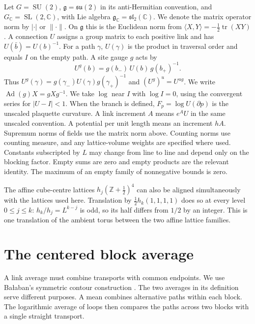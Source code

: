 \documentclass[11pt,letterpaper,reqno]{amsart}
\numberwithin{equation}{section}
\theoremstyle{definition}
\theoremstyle{remark}
\begin{document}
Let \(G=\operatorname{SU}(2)\),
\(\mathfrak g=\mathfrak{su}(2)\) in its anti-Hermitian convention,
and \(G_{\mathbb C}=\operatorname{SL}(2,\mathbb C)\), with Lie
algebra \(\mathfrak g_{\mathbb C}=\mathfrak{sl}_2(\mathbb C)\).
We denote the matrix operator norm by \(|\cdot|\) or \(\|\cdot\|\).
On \(\mathfrak g\) this is the Euclidean norm from
\(\langle X,Y\rangle=-\tfrac12\operatorname{tr}(XY)\).
A connection \(U\) assigns a group matrix to each positive link
and has \(U(\bar b)=U(b)^{-1}\). For a path \(\gamma\),
\(U(\gamma)\) is the product in traversal order and equals \(I\)
on the empty path. A site gauge \(g\) acts by
\[
 U^g(b)=g(b_-)\,U(b)\,g(b_+)^{-1}.
\]
Thus \(U^g(\gamma)=g(\gamma_-)U(\gamma)g(\gamma_+)^{-1}\)
and \((U^g)^u=U^{ug}\). We write
\(\operatorname{Ad}(g)X=gXg^{-1}\).
We take \(\log\) near \(I\) with \(\log I=0\), using the
convergent series for \(|U-I|<1\). When the branch is defined,
\(F_p=\log U(\partial p)\) is the unscaled plaquette curvature.
A link increment \(A\) means \(e^AU\) in the same unscaled
convention. A potential per unit length means an increment \(hA\).
Supremum norms of fields use the matrix norm above. Counting
norms use counting measure, and any lattice-volume weights are
specified where used. Constants subscripted by \(L\) may change
from line to line and depend only on the blocking factor.
Empty sums are zero and empty products are the relevant identity.
The maximum of an empty family of nonnegative bounds is zero.

The affine cube-centre lattices $h_j(\mathbb Z+\tfrac12)^4$ can
also be aligned simultaneously with the lattices used here. Translation
by $\tfrac12h_k(1,1,1,1)$ does so at every level $0\le j\le k$:
$h_k/h_j=L^{k-j}$ is odd, so its half differs from $1/2$ by an
integer. This is one translation of the ambient torus between the
two affine lattice families.

\section{The centered block average}\label{sec:avg-map}

A link average must combine transports with common endpoints. We use
Ba\l aban's symmetric contour construction
\cite[(0.4), (0.10)--(0.12)]{Bal87}. The two averages in its definition
serve different purposes. A mean combines alternative paths within each
block. The logarithmic average of loops then compares the paths across
two blocks with a single straight transport.
\end{document}
